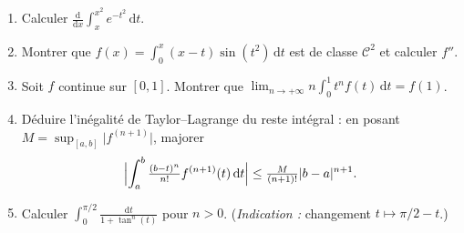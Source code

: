 \vspace{6pt}
\exolabel

\begin{mdframed}[style=exobar]
  \begin{enumerate}
    \item Calculer $\displaystyle\frac{\mathrm{d}}{\mathrm{d}x}\int_x^{x^2} e^{-t^2}\,\mathrm{d}t$.

    \item Montrer que $\displaystyle f(x) = \int_0^x (x-t)\sin(t^2)\,\mathrm{d}t$
          est de classe $\mathcal{C}^2$ et calculer $f''$.

    \item Soit $f$ continue sur $[0,1]$. Montrer que
          $\displaystyle\lim_{n\to+\infty} n\int_0^1 t^n f(t)\,\mathrm{d}t = f(1)$.

    \item Déduire l'inégalité de Taylor--Lagrange du reste intégral :
          en posant $M = \sup_{[a,b]}\bigl|f^{(n+1)}\bigr|$, majorer
          \[\Bigl|\int_a^b \tfrac{{(b-t)}^n}{n!}f^{(n+1)}(t)\,\mathrm{d}t\Bigr| \leq \tfrac{M}{(n+1)!}|b-a|^{n+1}.\]

    \item Calculer $\displaystyle\int_0^{\pi/2}\frac{\mathrm{d}t}{1+\tan^n(t)}$ pour $n > 0$.
          (\textit{Indication :} changement $t \mapsto \pi/2 - t$.)
  \end{enumerate}
\end{mdframed}

